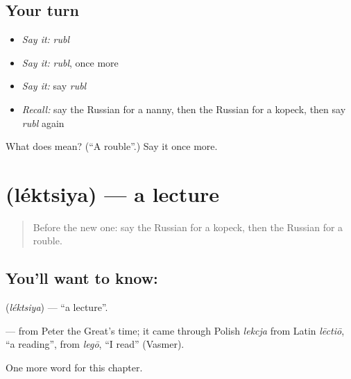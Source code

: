 \subsection*{Your turn}
\begin{itemize}
\raggedright
  \item \emph{Say it:} \emph{rubl}
  \item \emph{Say it:} \emph{rubl}, once more
  \item \emph{Say it:} say \emph{rubl}
  \item \emph{Recall:} say the Russian for a nanny, then the Russian for a kopeck, then say \emph{rubl} again
\end{itemize}

\begin{tcolorbox}[breakable,colback=teal!4,colframe=teal!35!black,title={Before you move on}]
What does  mean? (\textquotedblleft{}A rouble\textquotedblright{}.) Say it once more.
\end{tcolorbox}
\section[\texorpdfstring{\ru{лекция} (léktsiya)}{лекция (léktsiya)}]{ (léktsiya) — a lecture}

\label{lesson:RU-C231-lektsiya}



\begin{quote}
Before the new one: say the Russian for a kopeck, then the Russian for a rouble.
\end{quote}

\subsection*{You'll want to know: }
\textbf{} (\emph{léktsiya}) — \textquotedblleft{}a lecture\textquotedblright{}.

\begin{cousinweb}
\textbf{} — from Peter the Great's time; it came through Polish \emph{lekcja} from Latin \emph{lēctiō}, \textquotedblleft{}a reading\textquotedblright{}, from \emph{legō}, \textquotedblleft{}I read\textquotedblright{} (Vasmer).
\end{cousinweb}

\begin{grammarlens}[title={What you've built}]
One more word for this chapter.
\end{grammarlens}

